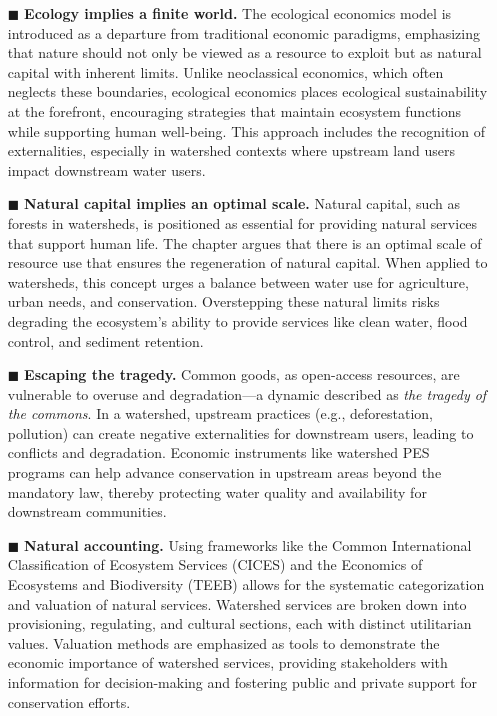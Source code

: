 \documentclass[./main_en.tex]{subfiles}
\begin{document}
\begin{itemize}
    
    \item[$\blacksquare$] \textbf{Ecology implies a finite world.} The ecological economics model is introduced as a departure from traditional economic paradigms, emphasizing that nature should not only be viewed as a resource to exploit but as natural capital with inherent limits. Unlike neoclassical economics, which often neglects these boundaries, ecological economics places ecological sustainability at the forefront, encouraging strategies that maintain ecosystem functions while supporting human well-being. This approach includes the recognition of externalities, especially in watershed contexts where upstream land users impact downstream water users.
    
    \item[$\blacksquare$] \textbf{Natural capital implies an optimal scale.} Natural capital, such as forests in watersheds, is positioned as essential for providing natural services that support human life. The chapter argues that there is an optimal scale of resource use that ensures the regeneration of natural capital. When applied to watersheds, this concept urges a balance between water use for agriculture, urban needs, and conservation. Overstepping these natural limits risks degrading the ecosystem’s ability to provide services like clean water, flood control, and sediment retention.
    
    \item[$\blacksquare$] \textbf{Escaping the tragedy.} Common goods, as open-access resources, are vulnerable to overuse and degradation—a dynamic described as \textit{the tragedy of the commons}. In a watershed, upstream practices (e.g., deforestation, pollution) can create negative externalities for downstream users, leading to conflicts and degradation. Economic instruments like watershed PES programs can help advance conservation in upstream areas beyond the mandatory law, thereby protecting water quality and availability for downstream communities.
    
    \item[$\blacksquare$] \textbf{Natural accounting.} Using frameworks like the Common International Classification of Ecosystem Services (CICES) and the Economics of Ecosystems and Biodiversity (TEEB) allows for the systematic categorization and valuation of natural services. Watershed services are broken down into provisioning, regulating, and cultural sections, each with distinct utilitarian values. Valuation methods are emphasized as tools to demonstrate the economic importance of watershed services, providing stakeholders with information for decision-making and fostering public and private support for conservation efforts.
    

\end{itemize}
\end{document}

